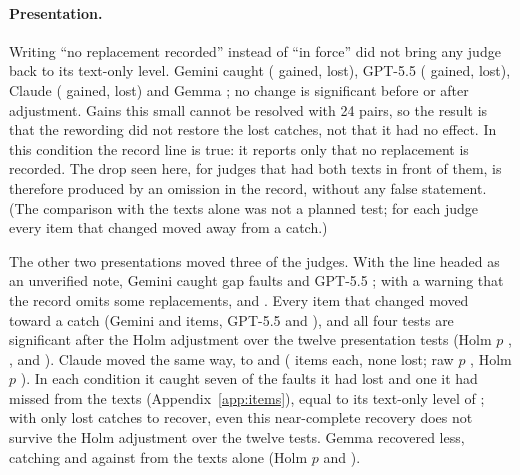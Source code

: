 \paragraph{Presentation.} Writing ``no replacement recorded'' instead of ``in force'' did not bring any judge back to
its text-only level. Gemini caught \EGeminiGapNorecord{} (\EGeminiArmNorecordGained{} gained, \EGeminiArmNorecordLost{}
lost), GPT-5.5 \EGPTGapNorecord{} (\EGPTArmNorecordGained{} gained, \EGPTArmNorecordLost{} lost), Claude
\EOpusGapNorecord{} (\EOpusArmNorecordGained{} gained, \EOpusArmNorecordLost{} lost) and Gemma \EGemmaGapNorecord; no
change is significant before or after adjustment. Gains this small cannot be resolved with 24 pairs, so the result
is that the rewording did not restore the lost catches, not that it had no effect. In this condition the record line
is true: it reports only that no replacement is recorded. The drop seen here,
for judges that had both texts in front of them, is therefore produced by an omission in the record, without any
false statement. (The comparison with the texts alone was not a planned test; for each judge every item that changed
moved away from a catch.)

The other two presentations moved three of the judges. With the line headed as an unverified note, Gemini caught
\EGeminiGapLowauth{} gap faults and GPT-5.5 \EGPTGapLowauth{}; with a warning that the record omits some replacements,
\EGeminiGapCaveat{} and \EGPTGapCaveat. Every item that changed moved toward a catch (Gemini \EGeminiArmLowauthGained{}
and \EGeminiArmCaveatGained{} items, GPT-5.5 \EGPTArmLowauthGained{} and \EGPTArmCaveatGained), and all four tests are
significant after the Holm adjustment over the twelve presentation tests (Holm $p$ \EGeminiArmLowauthHolm,
\EGeminiArmCaveatHolm, \EGPTArmLowauthHolm{} and \EGPTArmCaveatHolm). Claude moved
the same way, to \EOpusGapLowauth{} and \EOpusGapCaveat{} (\EOpusArmLowauthGained{} items each, none lost; raw
$p$ \EOpusArmLowauthRaw, Holm $p$ \EOpusArmLowauthHolm). In each condition it caught seven of the
\EOpusHTwoaLost{} faults it had lost and one it had missed from the texts (Appendix~\ref{app:items}), equal to its
text-only level of \EOpusGapTexts; with only \EOpusHTwoaLost{} lost catches to recover, even this near-complete
recovery does not survive the Holm adjustment over the twelve tests. Gemma recovered less,
catching \EGemmaGapLowauth{} and \EGemmaGapCaveat{} against \EGemmaGapTexts{} from the texts alone (Holm $p$
\EGemmaArmLowauthHolm{} and \EGemmaArmCaveatHolm).

